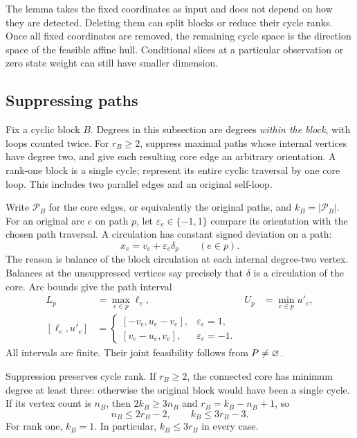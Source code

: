 The lemma takes the fixed coordinates as input and does not depend on how
they are detected. Deleting them can split blocks or reduce their cycle
ranks. Once all fixed coordinates are removed, the remaining
cycle space is the direction space of the feasible affine hull. Conditional
slices at a particular observation or zero state weight can still have
smaller dimension.

\subsection{Suppressing paths}\label{subsec:suppression}
Fix a cyclic block $B$. Degrees in this subsection are degrees \emph{within
the block}, with loops counted twice. For $r_B\ge2$, suppress maximal paths
whose internal vertices have degree two, and give each resulting core edge
an arbitrary orientation. A rank-one block is a single cycle; represent
its entire cyclic traversal by one core loop. This includes two parallel
edges and an original self-loop.

Write $\mathcal P_B$ for the core edges, or equivalently the original
paths, and $k_B=|\mathcal P_B|$. For an original arc $e$ on path $p$, let
$\varepsilon_e\in\{-1,1\}$ compare its orientation with the chosen
path traversal. A circulation has constant signed deviation on a path:
\begin{equation}\label{eq:path-deviation}
 x_e=v_e+\varepsilon_e\delta_p\qquad(e\in p).
\end{equation}
The reason is balance of the block circulation at each internal degree-two
vertex. Balances at the unsuppressed vertices say precisely that $\delta$
is a circulation of the core. Arc bounds give the path interval
\begin{align}
 L_p&=\max_{e\in p}\ell_e,& U_p&=\min_{e\in p}u'_e,\label{eq:path-intervals}\\
 [\ell_e,u'_e]&=
 \begin{cases}[-v_e,u_e-v_e],&\varepsilon_e=1,\\
 [v_e-u_e,v_e],&\varepsilon_e=-1.
 \end{cases}\nonumber
\end{align}
All intervals are finite. Their joint feasibility follows from
$P\ne\varnothing$.

Suppression preserves cycle rank. If $r_B\ge2$, the connected core has
minimum degree at least three: otherwise the original block would have
been a single cycle. If its vertex count is $n_B$, then
$2k_B\ge3n_B$ and $r_B=k_B-n_B+1$, so
\begin{equation}\label{eq:core-size}
 n_B\le2r_B-2,\qquad k_B\le3r_B-3.
\end{equation}
For rank one, $k_B=1$. In particular, $k_B\le3r_B$ in every case.

